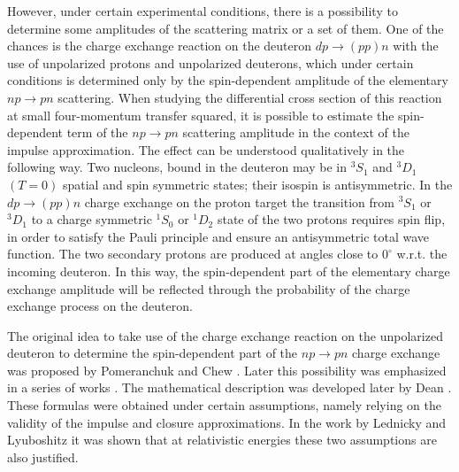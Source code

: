 \documentclass[twocolumn,epjc3]{svjour3}
\newcommand{\np}     {\ensuremath{np \rightarrow pn}\xspace}
\newcommand{\dpchex} {\ensuremath{dp \rightarrow (pp)n}\xspace}
\begin{document}
However, under certain experimental conditions, there is a possibility to
determine some amplitudes of the scattering matrix or a set of them. One of the
chances is the charge exchange reaction on the deuteron \dpchex with the use of
unpolarized protons and unpolarized deuterons, which under certain conditions is
determined only by the spin-dependent amplitude of the elementary \np
scattering. When studying the differential cross section of this reaction at
small four-momentum transfer squared, it is possible to estimate the
spin-dependent term of the \np scattering amplitude in the context of the
impulse approximation. The effect can be understood qualitatively in the
following way. Two nucleons, bound in the deuteron may be in $^3S_1$ and $^3D_1$
$(T = 0)$ spatial and spin symmetric states; their isospin is antisymmetric. In
the \dpchex charge exchange on the proton target the transition from $^3S_1$ or
$^3D_1$ to a charge symmetric $^1S_0$ or $^1D_2$ state of the two protons
requires spin flip, in order to satisfy the Pauli principle and ensure an
antisymmetric total wave function. The two secondary protons are produced at
angles close to $0^\circ$ w.r.t. the incoming deuteron. In this way, the
spin-dependent part of the elementary charge exchange amplitude will be
reflected through the probability of the charge exchange process on the
deuteron.

The original idea to take use of the charge exchange reaction on the unpolarized
deuteron to determine the spin-dependent part of the \np charge exchange was
proposed by Pomeranchuk \cite{pom51} and Chew \cite{chew51}. Later this
possibility was emphasized in a series of works
\cite{mig55,pom51_2,lap57,dea72,dea72_2,ala75,ala75_2,bug87}. The mathematical
description was developed later by Dean \cite{dea72,dea72_2}. These formulas
were obtained under certain assumptions, namely relying on the validity of the
impulse and closure approximations. In the work by Lednicky and Lyuboshitz
\cite{led04} it was shown that at relativistic energies these two assumptions
are also justified.
\end{document}
